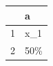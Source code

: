 \begin{table}[ht]
\centering
\begin{tabular}{rl}
  \hline
 & a \\ 
  \hline
1 & x\_1 \\ 
  2 & 50\% \\ 
   \hline
\end{tabular}
\end{table}

